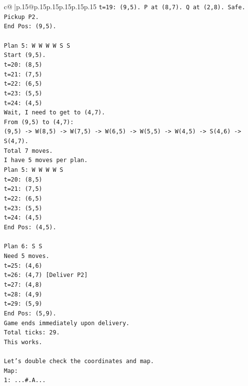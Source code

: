 \documentclass{article}
\begin{document}
{\begin{supertabular}{c@{$\;$}|p{.15\linewidth}@{}p{.15\linewidth}p{.15\linewidth}p{.15\linewidth}p{.15\linewidth}p{.15\linewidth}}
{{{\texttt{t=19: (9,5). P at (8,7). Q at (2,8). Safe. Pickup P2.} \\
\texttt{End Pos: (9,5).} \\
\\ 
\texttt{Plan 5: W W W W S S} \\
\texttt{Start (9,5).} \\
\texttt{t=20: (8,5)} \\
\texttt{t=21: (7,5)} \\
\texttt{t=22: (6,5)} \\
\texttt{t=23: (5,5)} \\
\texttt{t=24: (4,5)} \\
\texttt{Wait, I need to get to (4,7).} \\
\texttt{From (9,5) to (4,7):} \\
\texttt{(9,5) {-}> W(8,5) {-}> W(7,5) {-}> W(6,5) {-}> W(5,5) {-}> W(4,5) {-}> S(4,6) {-}> S(4,7).} \\
\texttt{Total 7 moves.} \\
\texttt{I have 5 moves per plan.} \\
\texttt{Plan 5: W W W W S} \\
\texttt{t=20: (8,5)} \\
\texttt{t=21: (7,5)} \\
\texttt{t=22: (6,5)} \\
\texttt{t=23: (5,5)} \\
\texttt{t=24: (4,5)} \\
\texttt{End Pos: (4,5).} \\
\\ 
\texttt{Plan 6: S S} \\
\texttt{Need 5 moves.} \\
\texttt{t=25: (4,6)} \\
\texttt{t=26: (4,7) {[}Deliver P2{]}} \\
\texttt{t=27: (4,8)} \\
\texttt{t=28: (4,9)} \\
\texttt{t=29: (5,9)} \\
\texttt{End Pos: (5,9).} \\
\texttt{Game ends immediately upon delivery.} \\
\texttt{Total ticks: 29.} \\
\texttt{This works.} \\
\\ 
\texttt{Let's double check the coordinates and map.} \\
\texttt{Map:} \\
\texttt{1: ...\#.A...} \\
}}}
\end{supertabular}}
\end{document}
